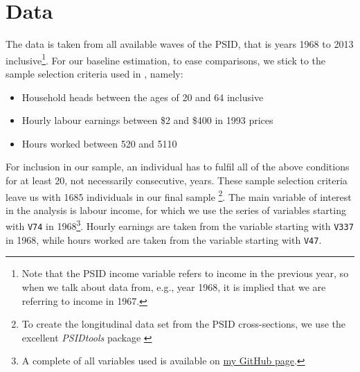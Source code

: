 \section{Data}
The data is taken from all available waves of the PSID, that is years 1968 to
2013 inclusive\footnote{Note that the PSID income variable refers to income in 
the previous year, so when we talk about data from, e.g., year 1968, it is 
implied that we are referring to income in 1967.}. For our baseline estimation,
to ease comparisons, we stick to the sample selection criteria used in 
\citet{Guvenen2009}, namely:
\begin{itemize}
	\item Household heads between the ages of 20 and 64 inclusive
    \item Hourly labour earnings between \$2 and \$400 in 1993 prices
    \item Hours worked between 520 and 5110
\end{itemize}
For inclusion in our sample, an individual has to fulfil all of the above
conditions for at least 20, not necessarily consecutive, years. These sample
selection criteria leave us with 1685 individuals in our final sample
\footnote{To create the longitudinal data set from the PSID cross-sections, we
use the excellent \textit{PSIDtools} package \citep{Kohler2015}}. The main 
variable of interest in the analysis is labour income, for which we use the 
series of variables starting with \texttt{V74} in 1968\footnote{A complete of 
all variables used is available on  
\href{https://github.com/nilshg/psidJulia/blob/master/create_panel.do}{my GitHub
page}.}. Hourly earnings are taken from the variable starting with \texttt{V337}
in 1968, while hours worked are taken from the variable starting with 
\texttt{V47}. 
 

